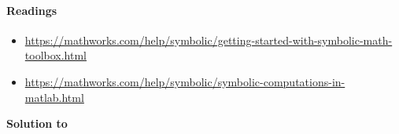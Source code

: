 \paragraph{Readings}
\begin{itemize}
  \item \url{https://mathworks.com/help/symbolic/getting-started-with-symbolic-math-toolbox.html}
  \item \url{https://mathworks.com/help/symbolic/symbolic-computations-in-matlab.html}
\end{itemize}


\begin{solution}\textbf{Solution to }
\ifDisplaySolutions

\fi
\newpage
\end{solution}